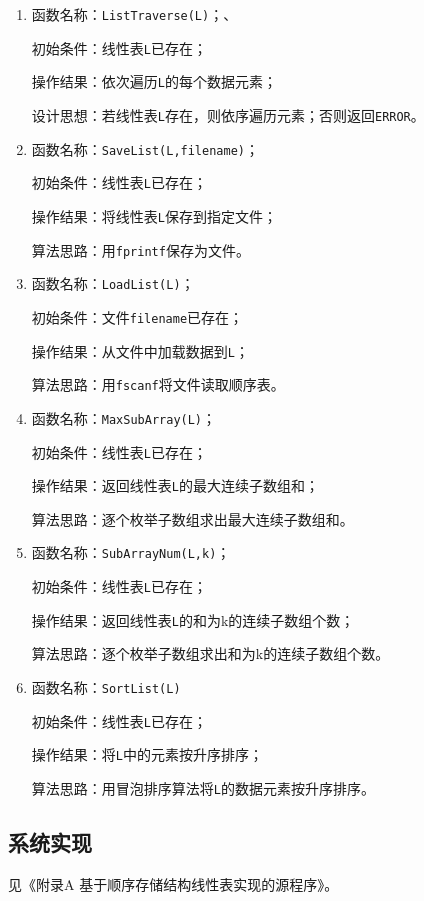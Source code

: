 \documentclass[supercite]{Experimental_Report}
\theoremstyle{definition}
\begin{document}
\begin{enumerate}
\item 函数名称：\verb|ListTraverse(L)|；、

初始条件：线性表\verb|L|已存在；

操作结果：依次遍历\verb|L|的每个数据元素；

设计思想：若线性表\verb|L|存在，则依序遍历元素；否则返回\verb|ERROR|。

\item 函数名称：\verb|SaveList(L,filename)|；

初始条件：线性表\verb|L|已存在；

操作结果：将线性表\verb|L|保存到指定文件；

算法思路：用\verb|fprintf|保存为文件。

\item 函数名称：\verb|LoadList(L)|；

初始条件：文件\verb|filename|已存在；

操作结果：从文件中加载数据到\verb|L|；

算法思路：用\verb|fscanf|将文件读取顺序表。

\item 函数名称：\verb|MaxSubArray(L)|；

初始条件：线性表\verb|L|已存在；

操作结果：返回线性表\verb|L|的最大连续子数组和；

算法思路：逐个枚举子数组求出最大连续子数组和。

\item 函数名称：\verb|SubArrayNum(L,k)|；

初始条件：线性表\verb|L|已存在；

操作结果：返回线性表\verb|L|的和为k的连续子数组个数；

算法思路：逐个枚举子数组求出和为k的连续子数组个数。

\item 函数名称：\verb|SortList(L)|

初始条件：线性表\verb|L|已存在；

操作结果：将\verb|L|中的元素按升序排序；

算法思路：用冒泡排序算法将\verb|L|的数据元素按升序排序。

\end{enumerate}

\subsection{系统实现}

见《附录A 基于顺序存储结构线性表实现的源程序》。
\end{document}
